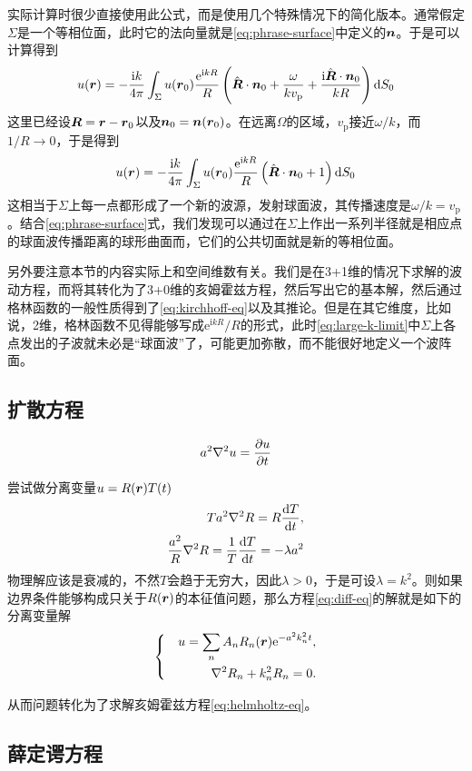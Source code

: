 \documentclass[UTF8]{ctexart}
\newenvironment{bigcase}{\left\{ \quad \begin{aligned}}{\end{aligned}\right.}
\newcommand*{\ii}{\mathrm{i}}
\newcommand*{\ee}{\mathrm{e}}
\begin{document}
实际计算时很少直接使用此公式，而是使用几个特殊情况下的简化版本。通常假定$\Sigma$是一个等相位面，此时它的法向量就是\eqref{eq:phrase-surface}中定义的$\vb*{n}$。于是可以计算得到
\begin{equation}
    u(\vb*{r}) = - \frac{\ii k}{4\pi} \int_\Sigma u(\vb*{r}_0) \frac{\ee^{\ii k R}}{R} \left( \hat{\vb*{R}} \cdot \vb*{n}_0 + \frac{\omega}{k v_\text{p}} + \frac{\ii \hat{\vb*{R}} \cdot \vb*{n}_0}{k R} \right) \dd{S_0}
\end{equation}
这里已经设$\vb*{R} = \vb*{r} - \vb*{r}_0$以及$\vb*{n}_0 = \vb*{n}(\vb*{r}_0)$。在远离$\Omega$的区域，$v_\text{p}$接近$\omega / k$，而$1/R \to 0$，于是得到
\begin{equation}
    u(\vb*{r}) = - \frac{\ii k}{4\pi} \int_\Sigma u(\vb*{r}_0) \frac{\ee^{\ii k R}}{R} \left( \hat{\vb*{R}} \cdot \vb*{n}_0 + 1 \right) \dd{S_0}
    \label{eq:large-k-limit}
\end{equation}
这相当于$\Sigma$上每一点都形成了一个新的波源，发射球面波，其传播速度是$\omega / k = v_\text{p}$。结合\eqref{eq:phrase-surface}式，我们发现可以通过在$\Sigma$上作出一系列半径就是相应点的球面波传播距离的球形曲面而，它们的公共切面就是新的等相位面。

另外要注意本节的内容实际上和空间维数有关。我们是在3+1维的情况下求解的波动方程，而将其转化为了3+0维的亥姆霍兹方程，然后写出它的基本解，然后通过格林函数的一般性质得到了\eqref{eq:kirchhoff-eq}以及其推论。但是在其它维度，比如说，2维，格林函数不见得能够写成$\ee^{\ii k R} / R$的形式，此时\eqref{eq:large-k-limit}中$\Sigma$上各点发出的子波就未必是“球面波”了，可能更加弥散，而不能很好地定义一个波阵面。

\subsection{扩散方程}

\begin{equation}
    a^2 \laplacian u = \pdv{u}{t}
    \label{eq:diff-eq}
\end{equation}

尝试做分离变量$u=R(\vb*{r}) T(t)$
\[
    \begin{split}
        T a^2 \laplacian R = R \dv{T}{t}, \\
        \frac{a^2}{R} \laplacian R = \frac{1}{T} \dv{T}{t} = -\lambda a^2
    \end{split}
\]
物理解应该是衰减的，不然$T$会趋于无穷大，因此$\lambda > 0$，于是可设$\lambda = k^2$。则如果边界条件能够构成只关于$R(\vb*{r})$的本征值问题，那么方程\eqref{eq:diff-eq}的解就是如下的分离变量解
\begin{equation}
    \begin{bigcase}
        u = \sum_n A_n R_n(\vb*{r}) \ee^{-a^2 k_n^2 t}, \\
        \laplacian R_n + k_n^2 R_n = 0.
    \end{bigcase}
\end{equation}

从而问题转化为了求解亥姆霍兹方程\eqref{eq:helmholtz-eq}。

\subsection{薛定谔方程}
\end{document}
